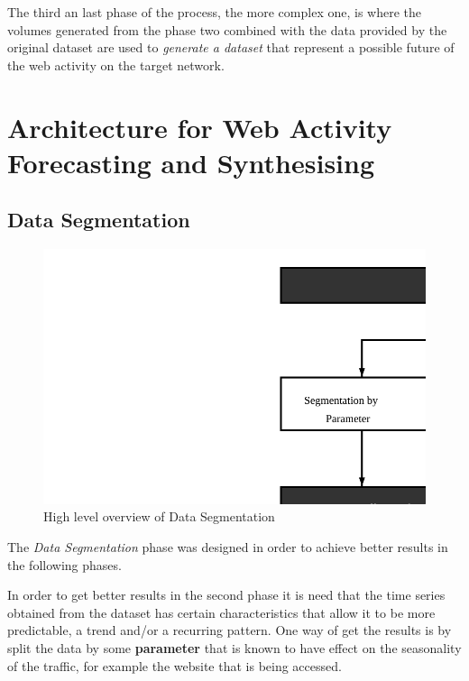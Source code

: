 The third an last phase of the process, the more complex one, is where the volumes
generated from the phase two combined with the data provided by the original
dataset are used to \emph{generate a dataset} that represent a possible future of the
web activity on the target network.

\section{Architecture for Web Activity Forecasting and Synthesising}

\subsection{Data Segmentation}

\begin{figure}[h] \begin{center} \leavevmode
\includegraphics[]{segmentation} \caption{ High level overview
of Data Segmentation} \label{fig:segmentation_arch} \end{center} \end{figure}

The \emph{Data Segmentation} phase was designed in order to achieve better
results in the following phases. 

In order to get better results in the second phase it is need that the time
series obtained from the dataset has certain characteristics that allow it to be
more predictable, a trend and/or a recurring pattern. One way of get the results
is by split the data by some \textbf{parameter} that is known to have effect on the
seasonality of the traffic, for example the website that is being accessed.


